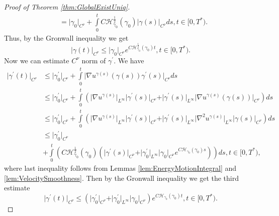 \documentclass[11pt,a4paper,leqno]{amsart}%
\newcommand\half{\frac12}
\theoremstyle{plain}
\theoremstyle{remark}
\theoremstyle{plain}
\numberwithin{equation}{section}
\def\intl{\int\limits}
\begin{document}
\begin{proof}[Proof of Theorem \ref{thm:GlobalExistUniq}]
\begin{align}
&=\vert \gamma_0\vert_{C^{\nu}}+\intl_0^tC\mathcal{H}_{\gamma_0}^{\half}(\gamma_0)\vert \gamma(s)\vert_{C^{\nu}}ds,t\in[0,T^*).
\end{align}
Thus, by the Gronwall inequality we get
\begin{equation}
\vert \gamma(t)\vert_{C^{\nu}}\leq\vert \gamma_0\vert_{C^{\nu}}e^{C\mathcal{H}_{\gamma_0}^{\half}(\gamma_0)t},t\in[0,T^*).\label{eqn:GEUEstim-aux}
\end{equation}
Now we can estimate $C^{\nu}$ norm of $\gamma^\prime$. We have
\begin{align}
\vert \gamma^\prime(t)\vert_{C^{\nu}}&\leq\vert \gamma^\prime_0\vert_{C^{\nu}}+\intl_0^t\vert \nabla
u^{\gamma(s)}(\gamma(s))\gamma^\prime(s)\vert_{C^{\nu}}ds\nonumber\\
&\leq \vert \gamma^\prime_0\vert_{C^{\nu}}+\intl_0^t(\vert \nabla
u^{\gamma(s)}\vert_{L^{\infty}}\vert \gamma^\prime(s)\vert_{C^{\nu}}+\vert \gamma^\prime(s)\vert_{L^{\infty}}\vert \nabla
u^{\gamma(s)}(\gamma(s))\vert_{C^{\nu}})ds\nonumber\\
&\leq\vert \gamma^\prime_0\vert_{C^{\nu}}+\intl_0^t(\vert \nabla
u^{\gamma(s)}\vert_{L^{\infty}}\vert \gamma^\prime(s)\vert_{C^{\nu}}+\vert \gamma^\prime(s)\vert_{L^{\infty}}\vert \nabla^2
u^{\gamma(s)}\vert_{L^{\infty}}\vert \gamma(s)\vert_{C^{\nu}})ds\nonumber\\
&\leq\vert \gamma^\prime_0\vert_{C^{\nu}}\nonumber\\
&+\intl_0^t(C\mathcal{H}_{\gamma_0}^{\half}(\gamma_0)(\vert \gamma^\prime(s)\vert_{C^{\nu}}+\vert \gamma^\prime_0\vert_{L^{\infty}}\vert \gamma_0\vert_{C^{\nu}}e^{C\mathcal{H}_{\gamma_0}(\gamma_0)s}))ds,t\in[0,T^*),
\end{align}
where last inequality follows from Lemmas
\ref{lem:EnergyMotionIntegral} and \ref{lem:VelocitySmoothness}.
Then by the Gronwall inequality we get the third estimate
\begin{equation}
\vert \gamma^\prime(t)\vert_{C^{\nu}}\leq(\vert \gamma^\prime_0\vert_{C^{\nu}}+\vert \gamma^\prime_0\vert_{L^{\infty}}\vert \gamma_0\vert_{C^{\nu}})e^{C\mathcal{H}_{\gamma_0}(\gamma_0)t},t\in[0,T^*).\label{eqn:GEUEstim-3}
\end{equation}

\end{proof}
\end{document}
